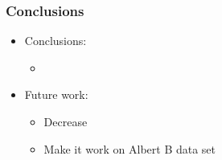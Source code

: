 \begin{frame}
\frametitle{Conclusions}
\begin{itemize}
\item Conclusions:
\begin{itemize}
\item 
\end{itemize}
\item Future work:
\begin{itemize}
\item Decrease 
\item Make it work on Albert B data set
\end{itemize}
\end{itemize}
\end{frame}